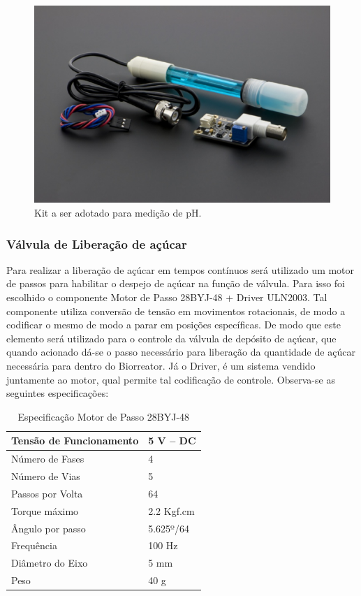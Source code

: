 \begin{figure}[h]
	\centering
	\includegraphics[keepaspectratio=true,scale=0.3]{figuras/sensorph.eps}
	\caption{Kit a ser adotado para medição de pH.}
	\label{sensorph}
\end{figure}

\subsubsection{Válvula de Liberação de açúcar}

Para realizar a liberação de açúcar em tempos contínuos será utilizado um motor de passos para habilitar o despejo de açúcar na função de válvula. Para isso foi escolhido o componente Motor de Passo 28BYJ-48 + Driver ULN2003. Tal componente utiliza conversão de tensão em movimentos rotacionais, de modo a codificar o mesmo de modo a parar em posições específicas. De modo que este elemento será utilizado para o controle da válvula de depósito de açúcar, que quando acionado dá-se o passo necessário para liberação da quantidade de açúcar necessária para dentro do Biorreator. Já o Driver, é um sistema vendido juntamente ao motor, qual permite tal codificação de controle. Observa-se as seguintes especificações:

\begin{table}[h]
\centering
\caption{Especificação Motor de Passo 28BYJ-48}
\label{table3}
\begin{tabular}{|l|l|}
\hline
Tensão de Funcionamento & 5 V – DC   \\ \hline
Número de Fases         & 4          \\ \hline
Número de Vias          & 5          \\ \hline
Passos por Volta        & 64         \\ \hline
Torque máximo           & 2.2 Kgf.cm \\ \hline
Ângulo por passo        & 5.625º/64  \\ \hline
Frequência              & 100 Hz     \\ \hline
Diâmetro do Eixo        & 5 mm       \\ \hline
Peso                    & 40 g       \\ \hline
\end{tabular}
\end{table}

